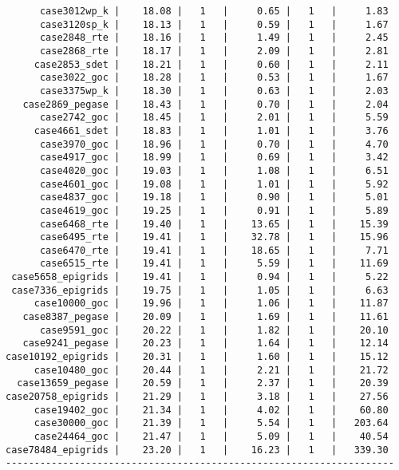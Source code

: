 \begin{verbatim}
      case3012wp_k |    18.08 |   1   |     0.65 |   1   |     1.83
      case3120sp_k |    18.13 |   1   |     0.59 |   1   |     1.67
      case2848_rte |    18.16 |   1   |     1.49 |   1   |     2.45
      case2868_rte |    18.17 |   1   |     2.09 |   1   |     2.81
     case2853_sdet |    18.21 |   1   |     0.60 |   1   |     2.11
      case3022_goc |    18.28 |   1   |     0.53 |   1   |     1.67
      case3375wp_k |    18.30 |   1   |     0.63 |   1   |     2.03
   case2869_pegase |    18.43 |   1   |     0.70 |   1   |     2.04
      case2742_goc |    18.45 |   1   |     2.01 |   1   |     5.59
     case4661_sdet |    18.83 |   1   |     1.01 |   1   |     3.76
      case3970_goc |    18.96 |   1   |     0.70 |   1   |     4.70
      case4917_goc |    18.99 |   1   |     0.69 |   1   |     3.42
      case4020_goc |    19.03 |   1   |     1.08 |   1   |     6.51
      case4601_goc |    19.08 |   1   |     1.01 |   1   |     5.92
      case4837_goc |    19.18 |   1   |     0.90 |   1   |     5.01
      case4619_goc |    19.25 |   1   |     0.91 |   1   |     5.89
      case6468_rte |    19.40 |   1   |    13.65 |   1   |    15.39
      case6495_rte |    19.41 |   1   |    32.78 |   1   |    15.96
      case6470_rte |    19.41 |   1   |    18.65 |   1   |     7.71
      case6515_rte |    19.41 |   1   |     5.59 |   1   |    11.69
 case5658_epigrids |    19.41 |   1   |     0.94 |   1   |     5.22
 case7336_epigrids |    19.75 |   1   |     1.05 |   1   |     6.63
     case10000_goc |    19.96 |   1   |     1.06 |   1   |    11.87
   case8387_pegase |    20.09 |   1   |     1.69 |   1   |    11.61
      case9591_goc |    20.22 |   1   |     1.82 |   1   |    20.10
   case9241_pegase |    20.23 |   1   |     1.64 |   1   |    12.14
case10192_epigrids |    20.31 |   1   |     1.60 |   1   |    15.12
     case10480_goc |    20.44 |   1   |     2.21 |   1   |    21.72
  case13659_pegase |    20.59 |   1   |     2.37 |   1   |    20.39
case20758_epigrids |    21.29 |   1   |     3.18 |   1   |    27.56
     case19402_goc |    21.34 |   1   |     4.02 |   1   |    60.80
     case30000_goc |    21.39 |   1   |     5.54 |   1   |   203.64
     case24464_goc |    21.47 |   1   |     5.09 |   1   |    40.54
case78484_epigrids |    23.20 |   1   |    16.23 |   1   |   339.30
--------------------------------------------------------------------
\end{verbatim}
    
